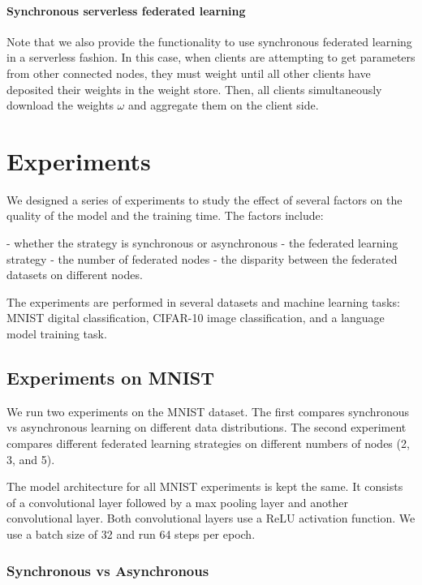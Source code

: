 \documentclass[twocolumn, switch]{article} %
\begin{document}
\paragraph{Synchronous serverless federated learning}

Note that we also provide the functionality to use synchronous federated learning in a serverless fashion. In this case, when clients are attempting to get parameters from other connected nodes, they must weight until all other clients have deposited their weights in the weight store. Then, all clients simultaneously download the weights $\omega$ and aggregate them on the client side. 

\section{Experiments}

We designed a series of experiments to study the effect of several factors on the quality of the model and the training time. The factors include:

- whether the strategy is synchronous or asynchronous
- the federated learning strategy
- the number of federated nodes
- the disparity between the federated datasets on different nodes.

The experiments are performed in several datasets and machine learning tasks: MNIST digital classification, CIFAR-10 image classification, and a language model training task.

\subsection{Experiments on MNIST}

We run two experiments on the MNIST dataset. The first compares synchronous vs asynchronous learning on different data distributions. The second experiment compares different federated learning strategies on different numbers of nodes (2, 3, and 5). 

The model architecture for all MNIST experiments is kept the same. It consists of a convolutional layer followed by a max pooling layer and  another convolutional layer. Both convolutional layers use a ReLU activation function. We use a batch size of 32 and run 64 steps per epoch.


\subsubsection{Synchronous vs Asynchronous}
\end{document}
